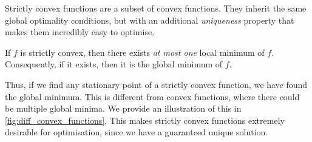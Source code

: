 Strictly convex functions are a subset of convex functions. They inherit the same global optimality conditions, but with an additional \textit{uniqueness} property that makes them incredibly easy to optimise.
\begin{definition}
    If $f$ is strictly convex, then there exists \textit{at most one} local minimum of $f$. Consequently, if it exists, then it is the global minimum of $f$.
\end{definition}
Thus, if we find any stationary point of a strictly convex function, we have found the global minimum. This is different from convex functions, where there could be multiple global minima. We provide an illustration of this in \cref{fig:diff_convex_functions}. This makes strictly convex functions extremely desirable for optimisation, since we have a guaranteed unique solution.

